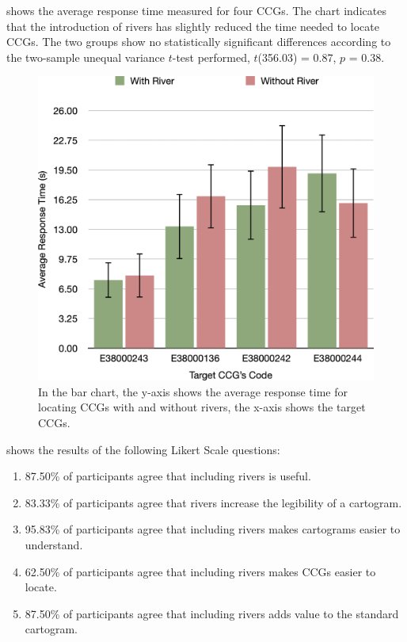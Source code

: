   shows the average response time measured for four CCGs. The chart indicates that the introduction of rivers has slightly reduced the time needed to locate CCGs. The two groups show no statistically significant differences according to the two-sample unequal variance $t$-test performed, $t$(356.03) = 0.87, $p$ = 0.38.

    {
        \begin{figure}[tb!]
            \centering
            \includegraphics[width=\columnwidth,keepaspectratio]{figure/evaluation/rt.png}
            \caption{In the bar chart, the y-axis shows the average response time for locating CCGs with and without rivers, the x-axis shows the target CCGs.}
            \label{fig:task-rt}
        \end{figure}
    }

  shows the results of the following Likert Scale questions:
\begin{enumerate}[label=(\Alph*),align=left,leftmargin=*,labelindent=1em]
    \item 87.50\% of participants agree that including rivers is useful.
    \item 83.33\% of participants agree that rivers increase the legibility of a cartogram.
    \item 95.83\% of participants agree that including rivers makes cartograms easier to understand.
    \item 62.50\% of participants agree that including rivers makes CCGs easier to locate.
    \item 87.50\% of participants agree that including rivers adds value to the standard cartogram.
\end{enumerate}

